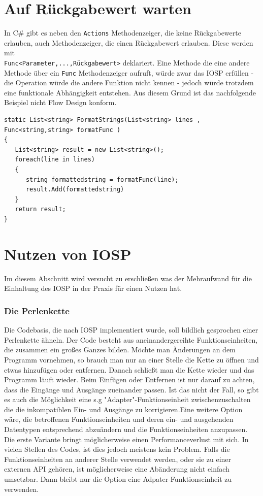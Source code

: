 \section{Auf Rückgabewert warten}

In C\# gibt es neben den \texttt{Actions} Methodenzeiger, die keine Rückgabewerte 
erlauben, auch Methodenzeiger, die einen Rückgabewert erlauben.
Diese werden mit\\\texttt{Func<Parameter,...,Rückgabewert>} deklariert.
Eine Methode die eine andere Methode über ein \texttt{Func} Methodenzeiger aufruft,
würde zwar das IOSP erfüllen - die Operation würde die andere Funktion nicht
kennen - jedoch würde trotzdem eine funktionale Abhängigkeit entstehen.
Aus diesem Grund ist das nachfolgende Beispiel nicht Flow Design konform.

\begin{lstlisting}[caption=Auf Rückgabewert warten]
static List<string> FormatStrings(List<string> lines , Func<string,string> formatFunc )
{
   List<string> result = new List<string>();
   foreach(line in lines)
   {
      string formattedstring = formatFunc(line);
      result.Add(formattedstring)
   }
   return result;
}
\end{lstlisting}


\section{Nutzen von IOSP}

Im diesem Abschnitt wird versucht zu erschließen was der Mehraufwand für die
Einhaltung des IOSP in der Praxis für einen Nutzen hat.
\subsubsection{Die Perlenkette}

Die Codebasis, die nach IOSP implementiert wurde, soll bildlich gesprochen einer
Perlenkette ähneln. Der Code besteht aus aneinandergereihte Funktionseinheiten,
die zusammen ein großes Ganzes bilden. Möchte man Änderungen an dem Programm
vornehmen, so brauch man nur an einer Stelle die Kette zu öffnen und etwas
hinzufügen oder entfernen. Danach schließt man die Kette wieder und das Programm
läuft wieder. Beim Einfügen oder Entfernen ist nur darauf zu achten, dass die
Eingänge und Ausgänge zueinander passen. Ist das nicht der Fall, so gibt es auch
die Möglichkeit eine s.g "Adapter"-Funktionseinheit zwischenzuschalten die die inkompatiblen
Ein- und Ausgänge zu korrigieren.Eine weitere Option wäre, die betroffenen
Funktionseinheiten und deren
ein- und ausgehenden Datentypen entsprechend abzuändern und die
Funktionseinheiten anzupassen.
Die erste Variante bringt möglicherweise einen Performanceverlust mit sich.
In vielen Stellen des Codes, ist dies jedoch meistens kein Problem.
Falls die Funktionseinheiten an anderer Stelle verwendet werden, oder sie zu
einer externen API gehören, ist möglicherweise eine Abänderung nicht
einfach umsetzbar. Dann bleibt nur die Option eine Adpater-Funktionseinheit zu verwenden.

